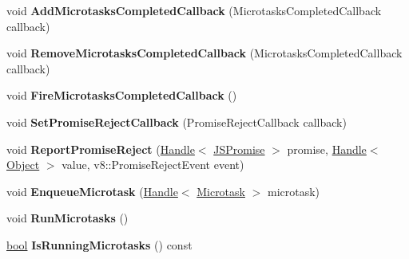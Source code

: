 \begin{DoxyCompactItemize}
void {\bfseries Add\+Microtasks\+Completed\+Callback} (Microtasks\+Completed\+Callback callback)
\item 
\mbox{\label{classv8_1_1internal_1_1Isolate_a1029a2cfee07a98151c85dc14730278c}} 
void {\bfseries Remove\+Microtasks\+Completed\+Callback} (Microtasks\+Completed\+Callback callback)
\item 
\mbox{\label{classv8_1_1internal_1_1Isolate_ae3a4c8a45a864f1c33fd652224fdb37a}} 
void {\bfseries Fire\+Microtasks\+Completed\+Callback} ()
\item 
\mbox{\label{classv8_1_1internal_1_1Isolate_a2d5bb799239417dc1105974638157f21}} 
void {\bfseries Set\+Promise\+Reject\+Callback} (Promise\+Reject\+Callback callback)
\item 
\mbox{\label{classv8_1_1internal_1_1Isolate_a5b511615a5766fa58f7e320d22ed77e6}} 
void {\bfseries Report\+Promise\+Reject} (\mbox{\hyperlink{classv8_1_1internal_1_1Handle}{Handle}}$<$ \mbox{\hyperlink{classv8_1_1internal_1_1JSPromise}{J\+S\+Promise}} $>$ promise, \mbox{\hyperlink{classv8_1_1internal_1_1Handle}{Handle}}$<$ \mbox{\hyperlink{classv8_1_1internal_1_1Object}{Object}} $>$ value, v8\+::\+Promise\+Reject\+Event event)
\item 
\mbox{\label{classv8_1_1internal_1_1Isolate_ab2708b5632653f07634bea2f35fb1e4b}} 
void {\bfseries Enqueue\+Microtask} (\mbox{\hyperlink{classv8_1_1internal_1_1Handle}{Handle}}$<$ \mbox{\hyperlink{classv8_1_1internal_1_1Microtask}{Microtask}} $>$ microtask)
\item 
\mbox{\label{classv8_1_1internal_1_1Isolate_a955f88ef2775d35d39f8fe1c4f441d54}} 
void {\bfseries Run\+Microtasks} ()
\item 
\mbox{\label{classv8_1_1internal_1_1Isolate_adfda0fc0a5978def4d02db1d15fbe6ab}} 
\mbox{\hyperlink{classbool}{bool}} {\bfseries Is\+Running\+Microtasks} () const
\item 
\mbox{\label{classv8_1_1internal_1_1Isolate_add04bfb0eb2a31500c62c8755657d6d4}} 

\end{DoxyCompactItemize}

